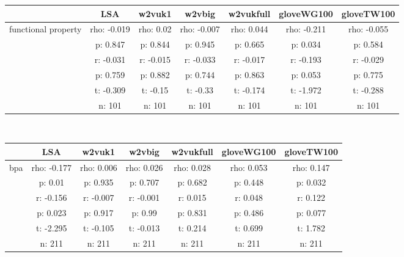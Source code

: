 \documentclass{article}
\begin{document}
\begin{tabular}{ccccccc|}\cline{2-7}
&\multicolumn{1}{|c}{LSA} & w2vuk1 & w2vbig & w2vukfull & gloveWG100 & gloveTW100 \\\hline
\multicolumn{1}{|c|}{\multirow{6}{*}{functional property}} & rho: -0.019 & rho: 0.02 & rho: -0.007 & rho: 0.044 & rho: -0.211 & rho: -0.055 \\
\multicolumn{1}{|c|}{} & p: 0.847 & p: 0.844 & p: 0.945 & p: 0.665 & p: 0.034 & p: 0.584 \\
\multicolumn{1}{|c|}{} & r: -0.031 & r: -0.015 & r: -0.033 & r: -0.017 & r: -0.193 & r: -0.029 \\
\multicolumn{1}{|c|}{} & p: 0.759 & p: 0.882 & p: 0.744 & p: 0.863 & p: 0.053 & p: 0.775 \\
\multicolumn{1}{|c|}{} & t: -0.309 & t: -0.15 & t: -0.33 & t: -0.174 & t: -1.972 & t: -0.288 \\
\multicolumn{1}{|c|}{} & n: 101 & n: 101 & n: 101 & n: 101 & n: 101 & n: 101 \\
\hline
\end{tabular}\\
\begin{tabular}{ccccccc|}\cline{2-7}
&\multicolumn{1}{|c}{LSA} & w2vuk1 & w2vbig & w2vukfull & gloveWG100 & gloveTW100 \\\hline
\multicolumn{1}{|c|}{\multirow{6}{*}{bpa}} & rho: -0.177 & rho: 0.006 & rho: 0.026 & rho: 0.028 & rho: 0.053 & rho: 0.147 \\
\multicolumn{1}{|c|}{} & p: 0.01 & p: 0.935 & p: 0.707 & p: 0.682 & p: 0.448 & p: 0.032 \\
\multicolumn{1}{|c|}{} & r: -0.156 & r: -0.007 & r: -0.001 & r: 0.015 & r: 0.048 & r: 0.122 \\
\multicolumn{1}{|c|}{} & p: 0.023 & p: 0.917 & p: 0.99 & p: 0.831 & p: 0.486 & p: 0.077 \\
\multicolumn{1}{|c|}{} & t: -2.295 & t: -0.105 & t: -0.013 & t: 0.214 & t: 0.699 & t: 1.782 \\
\multicolumn{1}{|c|}{} & n: 211 & n: 211 & n: 211 & n: 211 & n: 211 & n: 211 \\
\hline
\end{tabular}\\
\end{document}
